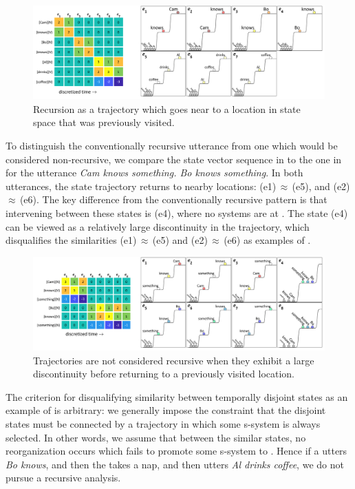   
\begin{figure}
\includegraphics[width=\textwidth]{figures/Tilsen-img112.png}
\caption{Recursion as a trajectory which goes near to a location in state space that was previously visited.}
\label{fig:5:8}
\end{figure}
 

  To distinguish the conventionally recursive utterance from one which would be considered non-recursive, we compare the state vector sequence in {} to the one in {} for the utterance \textit{Cam knows something. Bo knows something}. In both utterances, the state trajectory returns to nearby locations: (e1)\,${\approx}$\,(e5), and (e2)\,${\approx}$\,(e6). The key difference from the conventionally recursive pattern is that intervening between these states is (e4), where no systems are at . The state (e4) can be viewed as a relatively large discontinuity in the  trajectory, which disqualifies the similarities (e1)\,${\approx}$\,(e5) and (e2)\,${\approx}$\,(e6) as examples of .

  
\begin{figure}
\includegraphics[width=\textwidth]{figures/Tilsen-img113.png}
\caption{Trajectories are not considered recursive when they exhibit a large discontinuity before returning to a previously visited location.}
\label{fig:5:9}
\end{figure}
 

  The criterion for disqualifying similarity between temporally disjoint states as an example of  is arbitrary: we generally impose the constraint that the disjoint states must be connected by a trajectory in which some s-sys\-tem is always selected. In other words, we assume that between the similar states, no reorganization occurs which fails to promote some s-sys\-tem to . Hence if a  utters \textit{Bo knows}, and then the  takes a nap, and then utters \textit{Al drinks coffee}, we do not pursue a recursive analysis. 

